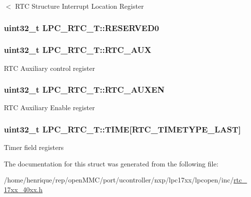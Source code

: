 $<$ R\-T\-C Structure Interrupt Location Register \hypertarget{structLPC__RTC__T_a94d0c8bf3402d34aac9170bac01bb4fb}{
\subsubsection[{R\-E\-S\-E\-R\-V\-E\-D0}]{ uint32\-\_\-t L\-P\-C\-\_\-\-R\-T\-C\-\_\-\-T\-::\-R\-E\-S\-E\-R\-V\-E\-D0}}\label{structLPC__RTC__T_a94d0c8bf3402d34aac9170bac01bb4fb}
\hypertarget{structLPC__RTC__T_ab476d508c9ea87e71724c30d36ece294}{
\subsubsection[{R\-T\-C\-\_\-\-A\-U\-X}]{ uint32\-\_\-t L\-P\-C\-\_\-\-R\-T\-C\-\_\-\-T\-::\-R\-T\-C\-\_\-\-A\-U\-X}}\label{structLPC__RTC__T_ab476d508c9ea87e71724c30d36ece294}
R\-T\-C Auxiliary control register \hypertarget{structLPC__RTC__T_af65651a26ceb3d710ccdba8f762a649f}{
\subsubsection[{R\-T\-C\-\_\-\-A\-U\-X\-E\-N}]{ uint32\-\_\-t L\-P\-C\-\_\-\-R\-T\-C\-\_\-\-T\-::\-R\-T\-C\-\_\-\-A\-U\-X\-E\-N}}\label{structLPC__RTC__T_af65651a26ceb3d710ccdba8f762a649f}
R\-T\-C Auxiliary Enable register \hypertarget{structLPC__RTC__T_adb4fbf67e8231188ed424c3ce226919e}{
\subsubsection[{T\-I\-M\-E}]{ uint32\-\_\-t L\-P\-C\-\_\-\-R\-T\-C\-\_\-\-T\-::\-T\-I\-M\-E\mbox{[}{\bf R\-T\-C\-\_\-\-T\-I\-M\-E\-T\-Y\-P\-E\-\_\-\-L\-A\-S\-T}\mbox{]}}}\label{structLPC__RTC__T_adb4fbf67e8231188ed424c3ce226919e}
Timer field registers 

The documentation for this struct was generated from the following file\-:\begin{DoxyCompactItemize}
\item 
/home/henrique/rep/open\-M\-M\-C/port/ucontroller/nxp/lpc17xx/lpcopen/inc/\hyperlink{rtc__17xx__40xx_8h}{rtc\-\_\-17xx\-\_\-40xx.\-h}\end{DoxyCompactItemize}
